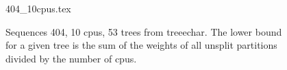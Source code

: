 \documentclass[12pt,a4paper]{article}
\begin{document}
 
\begin{figure}
\caption*{Sequences 404, 10 cpus, 53 trees from treeechar. The lower bound for a given tree is the sum of the weights of all unsplit partitions divided by the number of cpus.}
{404_10cpus.tex}
\end{figure}
 
\end{document}
